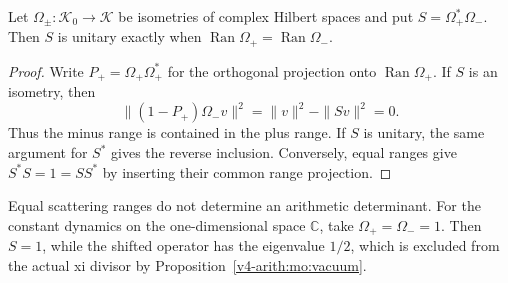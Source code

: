 \begin{proposition}
\label{v4-arith:mc:scattering}
Let $\Omega_\pm:\mathcal K_0\to\mathcal K$ be isometries of
complex Hilbert spaces and put $S=\Omega_+^*\Omega_-$.
Then $S$ is unitary exactly when
$\operatorname{Ran}\Omega_+=\operatorname{Ran}\Omega_-$.
\end{proposition}
\begin{proof}
Write $P_+=\Omega_+\Omega_+^*$ for the orthogonal projection onto
$\operatorname{Ran}\Omega_+$. If $S$ is an isometry, then
\[
 \|(1-P_+)\Omega_-v\|^2
 =\|v\|^2-\|Sv\|^2=0.
\]
Thus the minus range is contained in the plus range.
If $S$ is unitary, the same argument for $S^*$ gives the reverse
inclusion. Conversely, equal ranges give
$S^*S=1=SS^*$ by inserting their common range projection.
\end{proof}

Equal scattering ranges do not determine an arithmetic determinant.
For the constant dynamics on the one-dimensional space $\mathbb C$,
take $\Omega_+=\Omega_-=1$. Then $S=1$, while the shifted operator
has the eigenvalue $1/2$, which is excluded from the actual xi divisor
by Proposition~\ref{v4-arith:mo:vacuum}.
